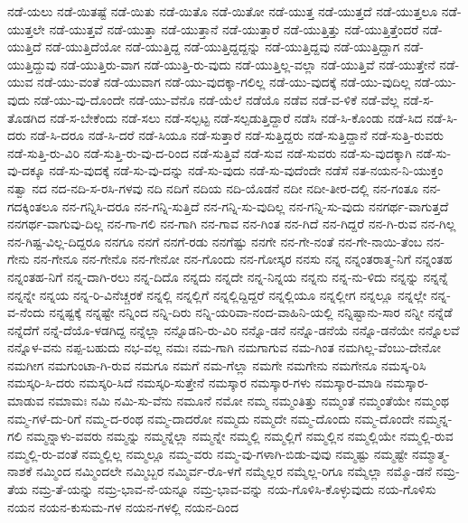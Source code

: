 {ನಡೆ-ಯಲು
ನಡೆ-ಯಿತಷ್ಟೆ
ನಡೆ-ಯಿತು
ನಡೆ-ಯಿತೊ
ನಡೆ-ಯಿತೋ
ನಡೆ-ಯುತ್ತ
ನಡೆ-ಯುತ್ತದೆ
ನಡೆ-ಯುತ್ತಲೂ
ನಡೆ-ಯುತ್ತಲೇ
ನಡೆ-ಯುತ್ತವೆ
ನಡೆ-ಯುತ್ತಾ
ನಡೆ-ಯುತ್ತಾನೆ
ನಡೆ-ಯುತ್ತಾರೆ
ನಡೆ-ಯುತ್ತಿತ್ತು
ನಡೆ-ಯುತ್ತಿತ್ತೆಂದರೆ
ನಡೆ-ಯುತ್ತಿದೆ
ನಡೆ-ಯುತ್ತಿದೆಯೋ
ನಡೆ-ಯುತ್ತಿದ್ದ
ನಡೆ-ಯುತ್ತಿದ್ದದ್ದನ್ನು
ನಡೆ-ಯುತ್ತಿದ್ದವು
ನಡೆ-ಯುತ್ತಿದ್ದಾಗ
ನಡೆ-ಯುತ್ತಿದ್ದುವು
ನಡೆ-ಯುತ್ತಿರು-ವಾಗ
ನಡೆ-ಯುತ್ತಿ-ರು-ವುದು
ನಡೆ-ಯುತ್ತಿಲ್ಲ-ವಲ್ಲಾ
ನಡೆ-ಯುತ್ತಿವೆ
ನಡೆ-ಯುತ್ತೇನೆ
ನಡೆ-ಯುವ
ನಡೆ-ಯು-ವಂತೆ
ನಡೆ-ಯುವಾಗ
ನಡೆ-ಯು-ವುದಕ್ಕಾ-ಗಲಿಲ್ಲ
ನಡೆ-ಯು-ವುದಕ್ಕೆ
ನಡೆ-ಯು-ವುದಿಲ್ಲ
ನಡೆ-ಯು-ವುದು
ನಡೆ-ಯು-ವು-ದೊಂದೇ
ನಡೆ-ಯು-ವೆನೊ
ನಡೆ-ಯೆಲೆ
ನಡೆಯೊ
ನಡೆವ
ನಡೆ-ವ-ಳಿಕೆ
ನಡೆ-ವೆಲ್ಲ
ನಡೆ-ಸ-ತೊಡಗಿದ
ನಡೆ-ಸ-ಬೇಕೆಂದು
ನಡೆ-ಸಲು
ನಡೆ-ಸಲ್ಪಟ್ಟ
ನಡೆ-ಸಲ್ಪಡುತ್ತಿದ್ದಾರೆ
ನಡೆಸಿ
ನಡೆ-ಸಿ-ಕೊಂಡು
ನಡೆ-ಸಿದ
ನಡೆ-ಸಿ-ದರು
ನಡೆ-ಸಿ-ದರೂ
ನಡೆ-ಸಿ-ದರೆ
ನಡೆ-ಸಿಯೂ
ನಡೆ-ಸುತ್ತಾರೆ
ನಡೆ-ಸುತ್ತಿದ್ದರು
ನಡೆ-ಸುತ್ತಿದ್ದಾನೆ
ನಡೆ-ಸುತ್ತಿ-ರುವರು
ನಡೆ-ಸುತ್ತಿ-ರು-ವಿರಿ
ನಡೆ-ಸುತ್ತಿ-ರು-ವು-ದ-ರಿಂದ
ನಡೆ-ಸುತ್ತಿವೆ
ನಡೆ-ಸುವ
ನಡೆ-ಸುವರು
ನಡೆ-ಸು-ವುದಕ್ಕಾಗಿ
ನಡೆ-ಸು-ವು-ದಕ್ಕೂ
ನಡೆ-ಸು-ವುದಕ್ಕೆ
ನಡೆ-ಸು-ವು-ದನ್ನು
ನಡೆ-ಸು-ವುದು
ನಡೆ-ಸು-ವುದೆಂದೇ
ನಡೆಸೆ
ನತ-ನಯನ-ನಿ-ಯುಕ್ತಂ
ನತ್ವಾ
ನದ
ನದ-ನದಿ-ಸ-ರಸಿ-ಗಳವು
ನದಿ
ನದಿಗೆ
ನದಿಯ
ನದಿ-ಯೊಡನೆ
ನದೀ
ನದೀ-ತೀರ-ದಲ್ಲಿ
ನನ-ಗಂತೂ
ನನ-ಗದಕ್ಕಿಂತಲೂ
ನನ-ಗನ್ನಿಸಿ-ದರೂ
ನನ-ಗನ್ನಿ-ಸುತ್ತಿದೆ
ನನ-ಗನ್ನಿ-ಸು-ವುದಿಲ್ಲ
ನನ-ಗನ್ನಿ-ಸು-ವುದು
ನನಗರ್ಥ-ವಾಗುತ್ತದೆ
ನನಗರ್ಥ-ವಾಗುವು-ದಿಲ್ಲ
ನನ-ಗಾ-ಗಲಿ
ನನ-ಗಾಗಿ
ನನ-ಗಾವ
ನನ-ಗಿಂತ
ನನ-ಗಿದೆ
ನನ-ಗಿದ್ದರೆ
ನನ-ಗಿ-ರುವ
ನನ-ಗಿಲ್ಲ
ನನ-ಗಿಷ್ಟ-ವಿಲ್ಲ-ದಿದ್ದರೂ
ನನಗೂ
ನನಗೆ
ನನಗೆ-ರಡು
ನನಗೆಷ್ಟು
ನನಗೇ
ನನ-ಗೇ-ನಂತೆ
ನನ-ಗೇ-ನಾಯಿ-ತೆಂಬ
ನನ-ಗೇನು
ನನ-ಗೇನೂ
ನನ-ಗೇನೊ
ನನ-ಗೇನೋ
ನನ-ಗೊಂದು
ನನ-ಗೋಸ್ಕರ
ನನಸು
ನನ್ನ
ನನ್ನಂತರಾತ್ಮ-ನಿಗೆ
ನನ್ನಂತಹ
ನನ್ನಂತಹ-ನಿಗೆ
ನನ್ನ-ದಾಗಿ-ರಲು
ನನ್ನ-ದಿದೊ
ನನ್ನದು
ನನ್ನದೇ
ನನ್ನ-ನಿನ್ನಯ
ನನ್ನನು
ನನ್ನ-ನು-ಳಿದು
ನನ್ನನ್ನು
ನನ್ನನ್ನೆ
ನನ್ನನ್ನೇ
ನನ್ನಯ
ನನ್ನ-ರಿ-ವಿನೆಚ್ಚರಕೆ
ನನ್ನಲ್ಲಿ
ನನ್ನಲ್ಲಿಗೆ
ನನ್ನಲ್ಲಿದ್ದಿದ್ದರೆ
ನನ್ನಲ್ಲಿಯೂ
ನನ್ನಲ್ಲೀಗ
ನನ್ನಲ್ಲೂ
ನನ್ನಲ್ಲೇ
ನನ್ನ-ವ-ನೆಂದು
ನನ್ನಷ್ಟಕ್ಕೆ
ನನ್ನಷ್ಟೇ
ನನ್ನಿಂದ
ನನ್ನಿ-ದಿರು
ನನ್ನಿ-ಯರಿವಾ-ನಂದ-ವಾಹಿನಿ-ಯಲ್ಲಿ
ನನ್ನಿಷ್ಟಾನು-ಸಾರ
ನನ್ನೀ
ನನ್ನೆಡೆ
ನನ್ನೆದೆಗೆ
ನನ್ನೆ-ದೆಯೊ-ಳಡಗಿದ್ದ
ನನ್ನೆಲ್ಲಾ
ನನ್ನೊಡನಿ-ರು-ವಿರಿ
ನನ್ನೊ-ಡನೆ
ನನ್ನೊ-ಡನೆಯೆ
ನನ್ನೊ-ಡನೆಯೇ
ನನ್ನೊಲವೆ
ನನ್ನೊಳ-ವನು
ನಪ್ಪ-ಬಹುದು
ನಭ-ವಲ್ಲ
ನಮಃ
ನಮ-ಗಾಗಿ
ನಮಗಾಗುವ
ನಮ-ಗಿಂತ
ನಮಗಿಲ್ಲ-ವೆಂಬು-ದೇನೋ
ನಮಗೀಗ
ನಮಗುಂಟಾ-ಗಿ-ರುವ
ನಮಗೂ
ನಮಗೆ
ನಮ-ಗೆಲ್ಲಾ
ನಮಗೇ
ನಮಗೇನು
ನಮಗೇನೂ
ನಮಸ್ಕ-ರಿಸಿ
ನಮಸ್ಕರಿ-ಸಿ-ದರು
ನಮಸ್ಕರಿ-ಸಿದೆ
ನಮಸ್ಕರಿ-ಸುತ್ತೇನೆ
ನಮಸ್ಕಾರ
ನಮಸ್ಕಾರ-ಗಳು
ನಮಸ್ಕಾರ-ಮಾಡಿ
ನಮಸ್ಕಾರ-ಮಾಡುವ
ನಮಾಮಃ
ನಮಿ
ನಮಿ-ಸು-ವೆನು
ನಮೂನೆ
ನಮೋ
ನಮ್ಮ
ನಮ್ಮಂತಿತ್ತು
ನಮ್ಮಂತೆ
ನಮ್ಮಂತೆಯೇ
ನಮ್ಮಂಥ
ನಮ್ಮ-ಗಳೆ-ದು-ರಿಗೆ
ನಮ್ಮ-ದ-ರಂಥ
ನಮ್ಮ-ದಾದರೋ
ನಮ್ಮದು
ನಮ್ಮದೇ
ನಮ್ಮ-ದೊಂದು
ನಮ್ಮ-ದೊಂದೇ
ನಮ್ಮನ್ನ-ಗಲಿ
ನಮ್ಮನ್ನಾಳು-ವವರು
ನಮ್ಮನ್ನು
ನಮ್ಮನ್ನೆಲ್ಲಾ
ನಮ್ಮನ್ನೇ
ನಮ್ಮಲ್ಲಿ
ನಮ್ಮಲ್ಲಿಗೆ
ನಮ್ಮಲ್ಲಿನ
ನಮ್ಮಲ್ಲಿಯೇ
ನಮ್ಮಲ್ಲಿ-ರುವ
ನಮ್ಮಲ್ಲಿ-ರು-ವಂತೆ
ನಮ್ಮಲ್ಲಿಲ್ಲ
ನಮ್ಮಲ್ಲೂ
ನಮ್ಮ-ವರು
ನಮ್ಮ-ವು-ಗಳಾಗಿ-ಬಿಡು-ವುವು
ನಮ್ಮಷ್ಟು
ನಮ್ಮಷ್ಟೇ
ನಮ್ಮಾತ್ಮ-ನಾಶಕೆ
ನಮ್ಮಿಂದ
ನಮ್ಮಿಂದಲೇ
ನಮ್ಮಿಬ್ಬರ
ನಮ್ಮಿರ್ವ-ರೊ-ಳಗೆ
ನಮ್ಮೆಲ್ಲರ
ನಮ್ಮೆಲ್ಲ-ರಿಗೂ
ನಮ್ಮೆಲ್ಲಾ
ನಮ್ಮೊ-ಡನೆ
ನಮ್ರ-ತೆಯ
ನಮ್ರ-ತೆ-ಯನ್ನು
ನಮ್ರ-ಭಾವ-ನೆ-ಯನ್ನೂ
ನಮ್ರ-ಭಾವ-ವನ್ನು
ನಯ-ಗೊಳಿಸಿ-ಕೊಳ್ಳುವುದು
ನಯ-ಗೊಳಿಸು
ನಯನ
ನಯನ-ಕುಸುಮ-ಗಳ
ನಯನ-ಗಳಲ್ಲಿ
ನಯನ-ದಿಂದ
}
